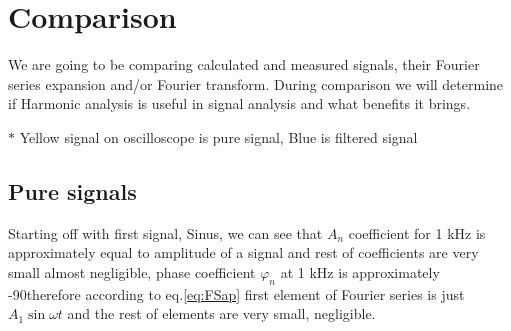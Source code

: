 \documentclass[notitlepage, a4paper, 11pt]{article}
\begin{document}
	\section{Comparison}
	We are going to be comparing calculated and measured signals, their Fourier series expansion and/or Fourier transform. During comparison we will determine if Harmonic analysis is useful in signal analysis and what benefits it brings.
	
	$\ast$ Yellow signal on oscilloscope is pure signal, Blue is filtered signal
	\subsection{Pure signals}
	Starting off with first signal, Sinus, we can see that $A_n$ coefficient for 1 kHz is approximately equal to amplitude of a signal and rest of coefficients are very small almost negligible, phase coefficient $\varphi_n$ at 1 kHz is approximately -90\degree therefore according to eq.\eqref{eq:FSap} first element of Fourier series is just $A_1 \sin \omega t$ and the rest of elements are very small, negligible.
\end{document}
